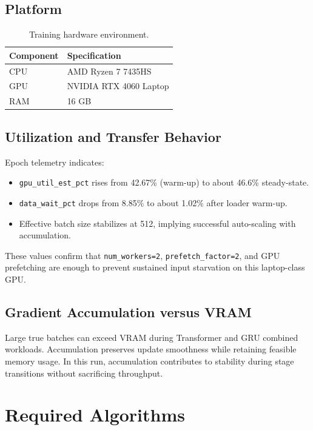 \documentclass{article}
\begin{document}
\subsection{Platform}
\begin{table}[t]
\centering
\begin{tabular}{ll}
\toprule
Component & Specification \\
\midrule
CPU & AMD Ryzen 7 7435HS \\
GPU & NVIDIA RTX 4060 Laptop \\
RAM & 16 GB \\
\bottomrule
\end{tabular}
\caption{Training hardware environment.}
\label{tab:hardware}
\end{table}

\subsection{Utilization and Transfer Behavior}
Epoch telemetry indicates:
\begin{itemize}
\item \texttt{gpu\_util\_est\_pct} rises from 42.67\% (warm-up) to about 46.6\% steady-state.
\item \texttt{data\_wait\_pct} drops from 8.85\% to about 1.02\% after loader warm-up.
\item Effective batch size stabilizes at 512, implying successful auto-scaling with accumulation.
\end{itemize}

These values confirm that \texttt{num\_workers=2}, \texttt{prefetch\_factor=2}, and GPU prefetching are enough to prevent sustained input starvation on this laptop-class GPU.

\subsection{Gradient Accumulation versus VRAM}
Large true batches can exceed VRAM during Transformer and GRU combined workloads. Accumulation preserves update smoothness while retaining feasible memory usage. In this run, accumulation contributes to stability during stage transitions without sacrificing throughput.

\section{Required Algorithms}
\end{document}
